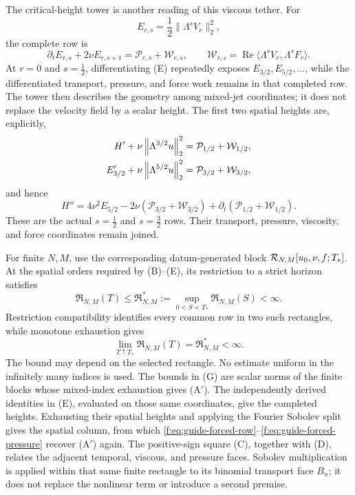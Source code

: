 The critical-height tower is another reading of this viscous tether.  For
\[
 E_{r,s}=\frac12\|\Lambda^sV_r\|_2^2,
\]
the complete row is
\[
 \partial_tE_{r,s}+2\nu E_{r,s+1}
 =\mathcal P_{r,s}+\mathcal W_{r,s},
 \qquad
 \mathcal W_{r,s}
 =\operatorname{Re}\langle\Lambda^sV_r,\Lambda^sF_r\rangle.
 \tag{E}
\]
At \(r=0\) and \(s=\tfrac12\), differentiating (E) repeatedly exposes
\(E_{3/2},E_{5/2},\ldots\), while the differentiated transport, pressure,
and force work remains in that completed row.  The tower then
describes the geometry among mixed-jet coordinates; it does not replace the
velocity field by a scalar height.
The first two spatial heights are, explicitly,
\begin{align*}
 H'+\nu\left\lVert \Lambda^{3/2}u\right\rVert_2^2
 &=\mathcal P_{1/2}+\mathcal W_{1/2},\\
 E_{3/2}'+\nu\left\lVert \Lambda^{5/2}u\right\rVert_2^2
 &=\mathcal P_{3/2}+\mathcal W_{3/2},
\end{align*}
and hence
\[
 H''=4\nu^2E_{5/2}
 -2\nu(\mathcal P_{3/2}+\mathcal W_{3/2})
 +\partial_t(\mathcal P_{1/2}+\mathcal W_{1/2}).
\]
These are the actual \(s=\tfrac12\) and \(s=\tfrac32\) rows.  Their
transport, pressure, viscosity, and force coordinates remain joined.

\label{f:guide:mixed-jet-map}
For finite \(N,M\), use the corresponding datum-generated block
\(\mathcal R_{N,M}[u_0,\nu,f;T_*]\).
At the spatial orders required by (B)--(E), its restriction to a strict
horizon satisfies
\[
 \mathfrak R_{N,M}(T)
 \le \mathfrak R_{N,M}^*
 :=\sup_{0<S<T_*}\mathfrak R_{N,M}(S)<\infty.
 \tag{F}
\]
Restriction compatibility identifies every common row in two such
rectangles, while monotone exhaustion gives
\[
 \lim_{T\uparrow T_*}\mathfrak R_{N,M}(T)
 =\mathfrak R_{N,M}^*<\infty.
 \tag{G}
\]
The bound may depend on the selected rectangle.  No estimate uniform in the
infinitely many indices is used.  The bounds in (G) are scalar norms of the
finite blocks whose mixed-index exhaustion gives (A$'$).  The
independently derived identities in (E), evaluated on those same coordinates,
give the completed heights.  Exhausting their spatial heights and applying the
Fourier Sobolev split gives the spatial column, from which
\eqref{f:eq:guide-forced-row}--\eqref{f:eq:guide-forced-pressure} recover
(A$'$) again.  The positive-sign square (C), together with (D), relates the
adjacent temporal, viscous, and pressure faces.  Sobolev
multiplication is applied within that same finite rectangle to its binomial
transport face \(B_n\); it does not replace the nonlinear term or introduce a
second premise.

